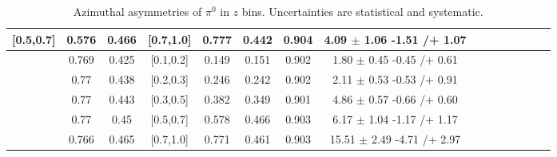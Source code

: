 \begin{table}[H]
\begin{tabular}{|c| c| c| c| c| c| c| c| c| c|c| c| c| c| c|}
[0.5,0.7]	&	0.576	&	0.466	&	[0.7,1.0]	&	0.777	&	0.442	&	0.904	&	4.09	$\pm$	1.06	-1.51	/+	1.07	\\ \hline
[0.7,1.0]	&	0.769	&	0.425	&	[0.1,0.2]	&	0.149	&	0.151	&	0.902	&	1.80	$\pm$	0.45	-0.45	/+	0.61	\\ \hline
[0.7,1.0]	&	0.77	&	0.438	&	[0.2,0.3]	&	0.246	&	0.242	&	0.902	&	2.11	$\pm$	0.53	-0.53	/+	0.91	\\ \hline
[0.7,1.0]	&	0.77	&	0.443	&	[0.3,0.5]	&	0.382	&	0.349	&	0.901	&	4.86	$\pm$	0.57	-0.66	/+	0.60	\\ \hline
[0.7,1.0]	&	0.77	&	0.45	&	[0.5,0.7]	&	0.578	&	0.466	&	0.903	&	6.17	$\pm$	1.04	-1.17	/+	1.17	\\ \hline
[0.7,1.0]	&	0.766	&	0.465	&	[0.7,1.0]	&	0.771	&	0.461	&	0.903	&	15.51	$\pm$	2.49	-4.71	/+	2.97	\\ \hline
\end{tabular}
\caption{Azimuthal asymmetries of $\pi^0$ in $z$ bins. Uncertainties are statistical and systematic.}
\label{tab:finalpi0zbin}
\end{table}

